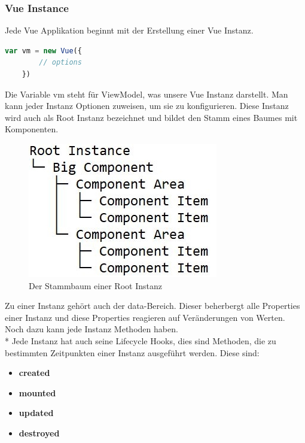 \clearpage

\subsubsection{Vue Instance}

Jede Vue Applikation beginnt mit der Erstellung einer Vue Instanz.

\begin{lstlisting}[language=JavaScript,caption=Vue Instanz,label=lst:impl:foo]
    var vm = new Vue({
        // options
    }) 
\end{lstlisting}

Die Variable vm steht für ViewModel, was unsere Vue Instanz darstellt. Man kann jeder Instanz Optionen zuweisen, um sie zu konfigurieren.
Diese Instanz wird auch als Root Instanz bezeichnet und bildet den Stamm eines Baumes mit Komponenten. 

\begin{figure}[htp]
    \centering
    \includegraphics[scale=1]{pics/RootComponentTree.JPG}
    \caption{Der Stammbaum einer Root Instanz}
    \label{fig:impl:RootComponentTree}
\end{figure}
Zu einer Instanz gehört auch der data-Bereich. Dieser beherbergt alle Properties einer
Instanz und diese Properties reagieren auf Veränderungen von Werten. Noch dazu kann jede Instanz Methoden haben. \\*
Jede Instanz hat auch seine Lifecycle Hooks, dies sind Methoden, die zu bestimmten Zeitpunkten einer Instanz ausgeführt werden. \cite{VueGuideInstance}
Diese sind:
\begin{itemize}
    \item \textbf{created}
    \item \textbf{mounted}          
    \item \textbf{updated} 
    \item \textbf{destroyed} 
\end{itemize}
\clearpage

